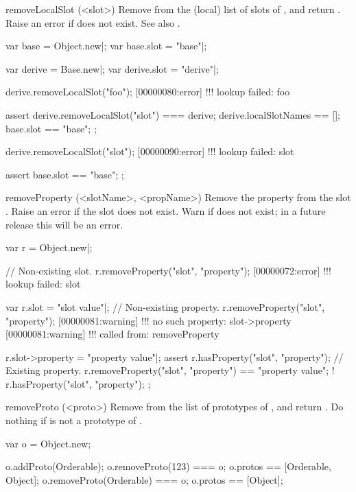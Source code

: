 \begin{urbiscriptapi}
\item[removeLocalSlot](<slot>)%
  Remove  from the (local) list of slots of \this, and return
  \this.  Raise an error if  does not exist.  See also
  .
\begin{urbiscript}
var base = Object.new|;
var base.slot = "base"|;

var derive = Base.new|;
var derive.slot = "derive"|;

derive.removeLocalSlot("foo");
[00000080:error] !!! lookup failed: foo

assert
{
  derive.removeLocalSlot("slot") === derive;
  derive.localSlotNames == [];
  base.slot == "base";
};

derive.removeLocalSlot("slot");
[00000090:error] !!! lookup failed: slot

assert
{
  base.slot == "base";
};
\end{urbiscript}


\item[removeProperty](<slotName>, <propName>)%
  Remove the property  from the slot .  Raise an
  error if the slot does not exist.  Warn if  does not exist;
  in a future release this will be an error.
\begin{urbiscript}
var r = Object.new|;

// Non-existing slot.
r.removeProperty("slot", "property");
[00000072:error] !!! lookup failed: slot

var r.slot = "slot value"|;
// Non-existing property.
r.removeProperty("slot", "property");
[00000081:warning] !!! no such property: slot->property
[00000081:warning] !!!    called from: removeProperty

r.slot->property = "property value"|;
assert
{
  r.hasProperty("slot", "property");
  // Existing property.
  r.removeProperty("slot", "property") == "property value";
  ! r.hasProperty("slot", "property");
};
\end{urbiscript}

\item[removeProto](<proto>)%
  Remove  from the list of prototypes of \this, and return \this.
  Do nothing if  is not a prototype of \this.
\begin{urbiassert}
var o = Object.new;

o.addProto(Orderable);
o.removeProto(123) === o;
o.protos == [Orderable, Object];
o.removeProto(Orderable) === o;
o.protos == [Object];
\end{urbiassert}


\end{urbiscriptapi}
